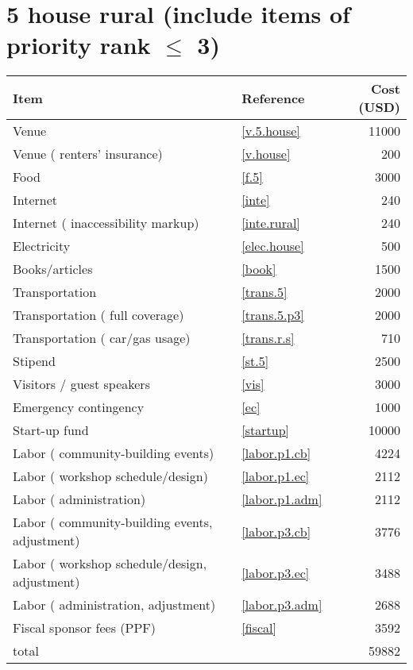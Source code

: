 \section*{5 house rural (include items of priority rank $\leq$ 3)}
\begin{center}
\begin{tabular}{llr}
Item & Reference & Cost (USD) \\ \hline
Venue & \ref{v.5.house} & 11000 \\
Venue ( renters' insurance) & \ref{v.house} & 200 \\
Food & \ref{f.5} & 3000 \\
Internet & \ref{inte} & 240 \\
Internet ( inaccessibility markup) & \ref{inte.rural} & 240 \\
Electricity & \ref{elec.house} & 500 \\
Books/articles & \ref{book} & 1500 \\
Transportation & \ref{trans.5} & 2000 \\
Transportation ( full coverage) & \ref{trans.5.p3} & 2000 \\
Transportation ( car/gas usage) & \ref{trans.r.s} & 710 \\
Stipend & \ref{st.5} & 2500 \\
Visitors / guest speakers & \ref{vis} & 3000 \\
Emergency contingency & \ref{ec} & 1000 \\
Start-up fund & \ref{startup} & 10000 \\
Labor ( community-building events) & \ref{labor.p1.cb} & 4224 \\
Labor ( workshop schedule/design) & \ref{labor.p1.ec} & 2112 \\
Labor ( administration) & \ref{labor.p1.adm} & 2112 \\
Labor ( community-building events, adjustment) & \ref{labor.p3.cb} & 3776 \\
Labor ( workshop schedule/design, adjustment) & \ref{labor.p3.ec} & 3488 \\
Labor ( administration, adjustment) & \ref{labor.p3.adm} & 2688 \\
Fiscal sponsor fees (PPF) & \ref{fiscal} & 3592 \\ \hline
total &  & 59882
\end{tabular}
\end{center}
\newpage
